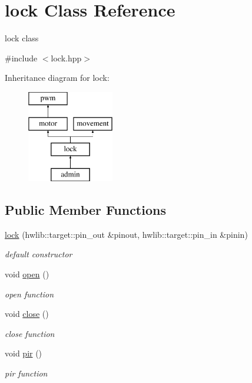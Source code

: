\hypertarget{classlock}{}\section{lock Class Reference}
\label{classlock}


lock class  




{\ttfamily \#include $<$lock.\+hpp$>$}

Inheritance diagram for lock\+:\begin{figure}[H]
\begin{center}
\leavevmode
\includegraphics[height=4.000000cm]{classlock}
\end{center}
\end{figure}
\subsection*{Public Member Functions}
\begin{DoxyCompactItemize}
\item 
\hyperlink{classlock_a70661afaf29f414bf0b838dfbc9c10a6}{lock} (hwlib\+::target\+::pin\+\_\+out \&pinout, hwlib\+::target\+::pin\+\_\+in \&pinin)
\begin{DoxyCompactList}\small\item\em default constructor \end{DoxyCompactList}\item 
void \hyperlink{classlock_a773859340b99fff94e8a21206d5906bd}{open} ()
\begin{DoxyCompactList}\small\item\em open function \end{DoxyCompactList}\item 
void \hyperlink{classlock_a7e4aac202a1b73f57338ea7f935cf9ce}{close} ()
\begin{DoxyCompactList}\small\item\em close function \end{DoxyCompactList}\item 
void \hyperlink{classlock_a1e203e71ff7300d4202516c1b08c3ad2}{pir} ()
\begin{DoxyCompactList}\small\item\em pir function \end{DoxyCompactList}\end{DoxyCompactItemize}


